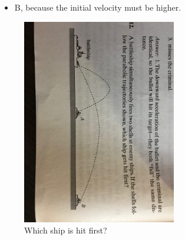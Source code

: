 \documentclass[10pt]{article}
\begin{document}
\begin{enumerate}
\begin{itemize}
\item B, because the initial velocity must be higher.
\end{itemize}
\begin{figure}[hb]
\centering
\includegraphics[width=0.6\textwidth,trim=0cm 30cm 0cm 45cm,clip=true]{battle.jpeg}
\caption{\label{fig:battle} Which ship is hit first?}
\end{figure}
\end{enumerate}
\end{document}
